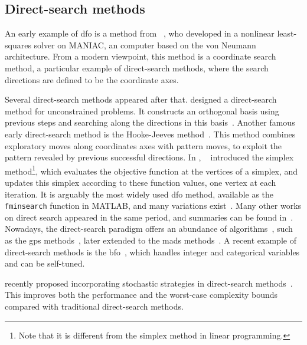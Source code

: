\subsection{Direct-search methods}

An early example of \gls{dfo} is a method from \citeauthor{Fermi_Metropolis_1952}~\cite{Fermi_Metropolis_1952}, who developed in \citeyear{Fermi_Metropolis_1952} a nonlinear least-squares solver on MANIAC, an computer based on the von Neumann architecture.
From a modern viewpoint, this method is a coordinate search method, a particular example of direct-search methods, where the search directions are defined to be the coordinate axes.

Several direct-search methods appeared after that.
\citeauthor{Rosenbrock_1960} designed a direct-search method for unconstrained problems.
It constructs an orthogonal basis using previous steps and searching along the directions in this basis~\cite{Rosenbrock_1960}.
Another famous early direct-search method is the Hooke-Jeeves method~\cite{Hooke_Jeeves_1961}.
This method combines exploratory moves along coordinates axes with pattern moves, to exploit the pattern revealed by previous successful directions.
In \citeyear{Nelder_Mead_1965}, \citeauthor{Nelder_Mead_1965}~\cite{Nelder_Mead_1965} introduced the simplex method\footnote{Note that it is different from the simplex method in linear programming.}, which evaluates the objective function at the vertices of a simplex, and updates this simplex according to these function values, one vertex at each iteration.
It is arguably the most widely used \gls{dfo} method, available as the \verb|fminsearch| function in MATLAB, and many variations exist~\cite{Wright_2012}.
Many other works on direct search appeared in the same period, and summaries can be found in~\cite{Fletcher_1965,Box_1966}.
Nowadays, the direct-search paradigm offers an abundance of algorithms~\cite{Kolda_Lewis_Torczon_2003}, such as the \gls{gps} methods~\cite{Booker_Etal_1999}, later extended to the \gls{mads} methods~\cite{Audet_Dennis_2006,Abramson_Audet_2006,Abramson_Etal_2009,Audet_Dennis_Digabel_2008,Digabel_2011}.
A recent example of direct-search methods is the \gls{bfo}~\cite{Porcelli_Toint_2017,Porcelli_Toint_2022}, which handles integer and categorical variables and can be self-tuned.

 recently proposed incorporating stochastic strategies in direct-search methods~\cite{Gratton_Etal_2015,Gratton_Etal_2019}.
This improves both the performance and the worst-case complexity bounds compared with traditional direct-search methods.

